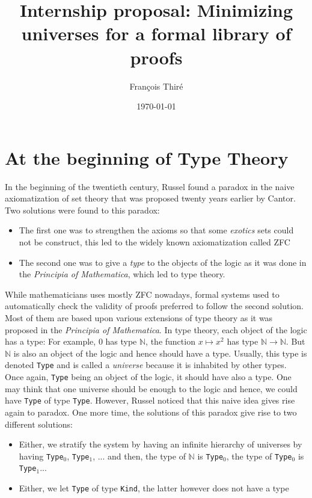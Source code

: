 \documentclass{article}
\title{Internship proposal: Minimizing universes for a formal library of proofs}
\author{François Thiré}
\date{\today}
\begin{document}
\maketitle
\section{At the beginning of Type Theory}
In the beginning of the twentieth century, Russel found a paradox in the naive axiomatization of set theory that was proposed twenty years earlier by Cantor. Two solutions were found to this paradox:
\begin{itemize}
\item The first one was to strengthen the axioms so that some \textit{exotics} sets could not be construct, this led to the widely known axiomatization called ZFC
\item The second one was to give a \textit{type} to the objects of the logic as it was done in the \textit{Principia of Mathematica}, which led to type theory.
\end{itemize}

While mathematicians uses mostly ZFC nowadays, formal systems used to automatically check the validity of proofs preferred to follow the second solution. Most of them are based upon various extensions of type theory as it was proposed in the \textit{Principia of Mathematica}. In type theory, each object of the logic has a type: For example, \(0\) has type \(\mathbb{N}\), the function \(x \mapsto x^2\) has type \(\mathbb{N} \to \mathbb{N}\). But \(\mathbb{N}\) is also an object of the logic and hence should have a type. Usually, this type is denoted \texttt{Type} and is called a \textit{universe} because it is inhabited by other types. Once again, \texttt{Type} being an object of the logic, it should have also a type. One may think that one universe should be enough to the logic and hence, we could have \texttt{Type} of type \texttt{Type}. However, Russel noticed that this naive idea gives rise again to paradox. One more time, the solutions of this paradox give rise to two different solutions:

\begin{itemize}
\item Either, we stratify the system by having an infinite hierarchy of universes by having \texttt{Type}\(_0\), \texttt{Type}\(_1\), ... and then, the type of \(\mathbb{N}\) is \texttt{Type}\(_0\), the type of \texttt{Type}\(_0\) is \texttt{Type}\(_1\)...
\item Either, we let \texttt{Type} of type \texttt{Kind}, the latter however does not have a type
\end{itemize}
\end{document}
